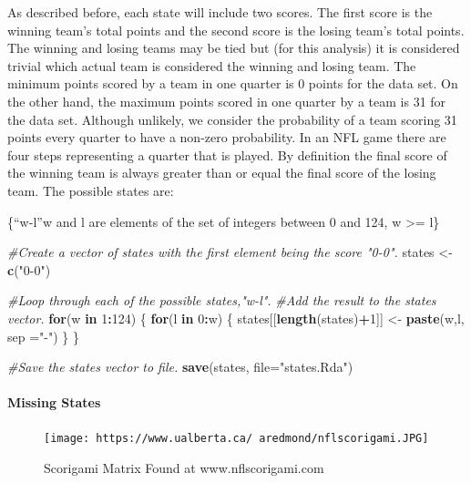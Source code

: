 \documentclass[
]{article}
\newenvironment{Shaded}{\begin{snugshade}}{\end{snugshade}}
\newcommand{\CommentTok}[1]{\textcolor[rgb]{0.56,0.35,0.01}{\textit{#1}}}
\newcommand{\ControlFlowTok}[1]{\textcolor[rgb]{0.13,0.29,0.53}{\textbf{#1}}}
\newcommand{\DataTypeTok}[1]{\textcolor[rgb]{0.13,0.29,0.53}{#1}}
\newcommand{\DecValTok}[1]{\textcolor[rgb]{0.00,0.00,0.81}{#1}}
\newcommand{\KeywordTok}[1]{\textcolor[rgb]{0.13,0.29,0.53}{\textbf{#1}}}
\newcommand{\NormalTok}[1]{#1}
\newcommand{\OperatorTok}[1]{\textcolor[rgb]{0.81,0.36,0.00}{\textbf{#1}}}
\newcommand{\StringTok}[1]{\textcolor[rgb]{0.31,0.60,0.02}{#1}}
\let\oldparagraph\paragraph
\renewcommand{\paragraph}[1]{\oldparagraph{#1}\mbox{}}
\begin{document}
As described before, each state will include two scores. The first score
is the winning team's total points and the second score is the losing
team's total points. The winning and losing teams may be tied but (for
this analysis) it is considered trivial which actual team is considered
the winning and losing team. The minimum points scored by a team in one
quarter is 0 points for the data set. On the other hand, the maximum
points scored in one quarter by a team is 31 for the data set. Although
unlikely, we consider the probability of a team scoring 31 points every
quarter to have a non-zero probability. In an NFL game there are four
steps representing a quarter that is played. By definition the final
score of the winning team is always greater than or equal the final
score of the losing team. The possible states are:

\{``w-l''\textbar{}w and l are elements of the set of integers between 0
and 124, w \textgreater{}= l\}

\begin{Shaded}
\begin{Highlighting}[]
\CommentTok{#Create a vector of states with the first element being the score "0-0".}
\NormalTok{states <-}\StringTok{ }\KeywordTok{c}\NormalTok{(}\StringTok{"0-0"}\NormalTok{)}

\CommentTok{#Loop through each of the possible states,"w-l".}
\CommentTok{#Add the result to the states vector.}
\ControlFlowTok{for}\NormalTok{(w }\ControlFlowTok{in} \DecValTok{1}\OperatorTok{:}\DecValTok{124}\NormalTok{) \{}
  \ControlFlowTok{for}\NormalTok{(l }\ControlFlowTok{in} \DecValTok{0}\OperatorTok{:}\NormalTok{w) \{}
\NormalTok{    states[[}\KeywordTok{length}\NormalTok{(states)}\OperatorTok{+}\DecValTok{1}\NormalTok{]] <-}\StringTok{ }\KeywordTok{paste}\NormalTok{(w,l, }\DataTypeTok{sep =}\StringTok{"-"}\NormalTok{)}
\NormalTok{  \}}
\NormalTok{\}}

\CommentTok{#Save the states vector to file.}
\KeywordTok{save}\NormalTok{(states, }\DataTypeTok{file=}\StringTok{"states.Rda"}\NormalTok{)}
\end{Highlighting}
\end{Shaded}

\hypertarget{missing-states}{%
\paragraph{Missing States}\label{missing-states}}

\begin{figure}
\centering
\texttt{[image: https://www.ualberta.ca/~aredmond/nflscorigami.JPG]}
\caption{Scorigami Matrix Found at www.nflscorigami.com}
\end{figure}
\end{document}
